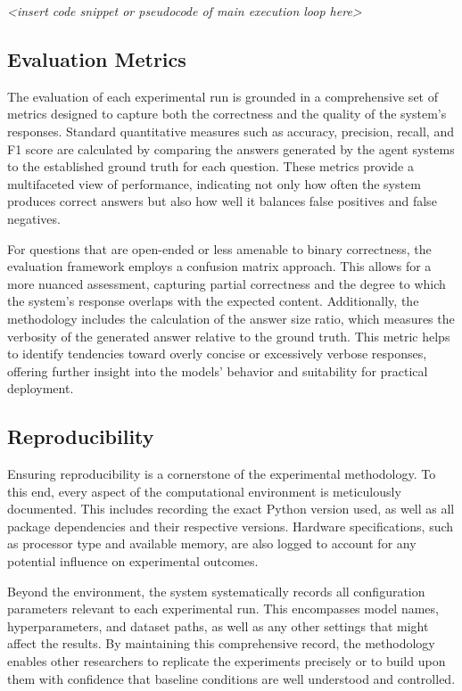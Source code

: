             \textit{<insert code snippet or pseudocode of main execution loop here>}

        \subsection{Evaluation Metrics}

            The evaluation of each experimental run is grounded in a comprehensive set of metrics designed to capture both the correctness and the quality of the system’s responses. Standard quantitative measures such as accuracy, precision, recall, and F1 score are calculated by comparing the answers generated by the agent systems to the established ground truth for each question. These metrics provide a multifaceted view of performance, indicating not only how often the system produces correct answers but also how well it balances false positives and false negatives.

            For questions that are open-ended or less amenable to binary correctness, the evaluation framework employs a confusion matrix approach. This allows for a more nuanced assessment, capturing partial correctness and the degree to which the system’s response overlaps with the expected content. Additionally, the methodology includes the calculation of the answer size ratio, which measures the verbosity of the generated answer relative to the ground truth. This metric helps to identify tendencies toward overly concise or excessively verbose responses, offering further insight into the models’ behavior and suitability for practical deployment.

        \subsection{Reproducibility}

            Ensuring reproducibility is a cornerstone of the experimental methodology. To this end, every aspect of the computational environment is meticulously documented. This includes recording the exact Python version used, as well as all package dependencies and their respective versions. Hardware specifications, such as processor type and available memory, are also logged to account for any potential influence on experimental outcomes.

            Beyond the environment, the system systematically records all configuration parameters relevant to each experimental run. This encompasses model names, hyperparameters, and dataset paths, as well as any other settings that might affect the results. By maintaining this comprehensive record, the methodology enables other researchers to replicate the experiments precisely or to build upon them with confidence that baseline conditions are well understood and controlled.

